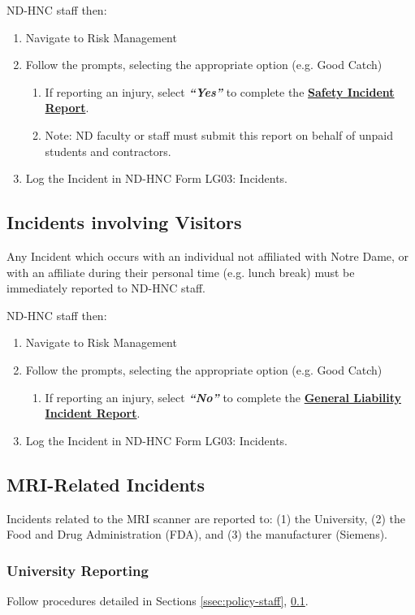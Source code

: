 \documentclass[11pt]{article}
\begin{document}
ND-HNC staff then:
\begin{enumerate}
	\item Navigate to Risk Management\cite{riskman}
	\item Follow the prompts, selecting the appropriate option (e.g. Good Catch)
	\begin{enumerate}
		\item If reporting an injury, select \textit{\textbf{``Yes''}} to complete the \textbf{\underline{Safety Incident Report}}.
		\item Note: ND faculty or staff must submit this report on behalf of unpaid students and contractors.
	\end{enumerate}
	\item Log the Incident in ND-HNC Form LG03: Incidents.
\end{enumerate}

%
\subsection{Incidents involving Visitors}
\label{ssec:policy-visitor}
Any Incident which occurs with an individual not affiliated with Notre Dame, or with an affiliate during their personal time (e.g. lunch break) must be immediately reported to ND-HNC staff.

ND-HNC staff then:
\begin{enumerate}
	\item Navigate to Risk Management\cite{riskman}
	\item Follow the prompts, selecting the appropriate option (e.g. Good Catch)
	\begin{enumerate}
		\item If reporting an injury, select \textit{\textbf{``No''}} to complete the \textbf{\uline{General Liability Incident Report}}.
	\end{enumerate}
	\item Log the Incident in  ND-HNC Form LG03: Incidents.
\end{enumerate}

%
\subsection{MRI-Related Incidents}
Incidents related to the MRI scanner are reported to: (1) the University, (2) the Food and Drug Administration (FDA), and (3) the manufacturer (Siemens)\cite{medrep}.

\subsubsection{University Reporting}
Follow procedures detailed in Sections \ref{ssec:policy-staff}, \ref{ssec:policy-visitor}.
\end{document}
